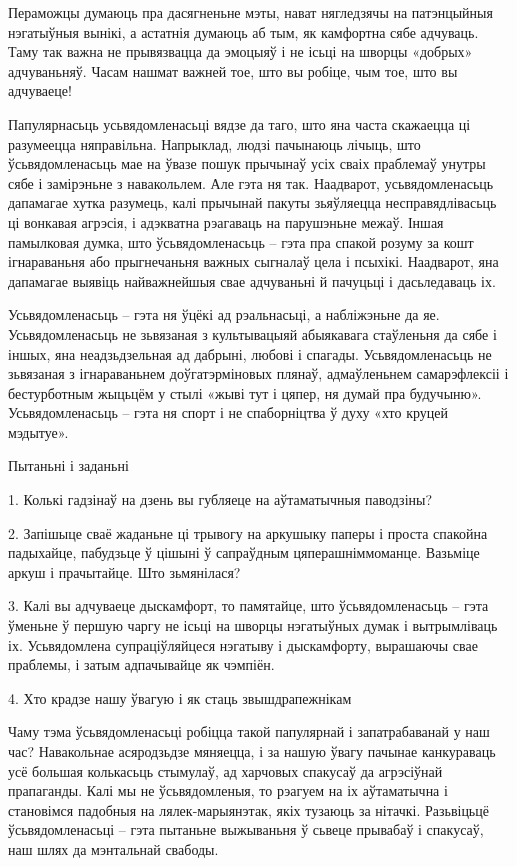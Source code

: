Пераможцы думаюць пра дасягненьне мэты, нават нягледзячы на патэнцыйныя нэгатыўныя вынікі, а астатнія думаюць аб тым, як камфортна сябе адчуваць. Таму так важна не прывязвацца да эмоцыяў і не ісьці на шворцы «добрых» адчуваньняў. Часам нашмат важней тое, што вы робіце, чым тое, што вы адчуваеце!

Папулярнасьць усьвядомленасьці вядзе да таго, што яна часта скажаецца ці разумеецца няправільна. Напрыклад, людзі пачынаюць лічыць, што ўсьвядомленасьць мае на ўвазе пошук прычынаў усіх сваіх праблемаў унутры сябе і замірэньне з навакольлем. Але гэта ня так. Наадварот, усьвядомленасьць дапамагае хутка разумець, калі прычынай пакуты зьяўляецца несправядлівасьць ці вонкавая агрэсія, і адэкватна рэагаваць на парушэньне межаў. Іншая памылковая думка, што ўсьвядомленасьць – гэта пра спакой розуму за кошт ігнараваньня або прыгнечаньня важных сыгналаў цела і псыхікі. Наадварот, яна дапамагае выявіць найважнейшыя свае адчуваньні й пачуцьці і дасьледаваць іх.

Усьвядомленасьць – гэта ня ўцёкі ад рэальнасьці, а набліжэньне да яе. Усьвядомленасьць не зьвязаная з культывацыяй абыякавага стаўленьня да сябе і іншых, яна неадзьдзельная ад дабрыні, любові і спагады. Усьвядомленасьць не зьвязаная з ігнараваньнем доўгатэрміновых плянаў, адмаўленьнем самарэфлексіі і бестурботным жыцьцём у стылі «жыві тут і цяпер, ня думай пра будучыню». Усьвядомленасьць – гэта ня спорт і не спаборніцтва ў духу «хто круцей мэдытуе».

Пытаньні і заданьні

1. Колькі гадзінаў на дзень вы губляеце на аўтаматычныя паводзіны?

2. Запішыце сваё жаданьне ці трывогу на аркушыку паперы і проста спакойна падыхайце, пабудзьце ў цішыні ў сапраўдным цяперашніммоманце. Вазьміце аркуш і прачытайце. Што зьмянілася?

3. Калі вы адчуваеце дыскамфорт, то памятайце, што ўсьвядомленасьць – гэта ўменьне ў першую чаргу не ісьці на шворцы нэгатыўных думак і вытрымліваць іх. Усьвядомлена супраціўляйцеся нэгатыву і дыскамфорту, вырашаючы свае праблемы, і затым адпачывайце як чэмпіён.


4. Хто крадзе нашу ўвагую і як стаць звышдрапежнікам

Чаму тэма ўсьвядомленасьці робіцца такой папулярнай і запатрабаванай у наш час? Навакольнае асяродзьдзе мяняецца, і за нашую ўвагу пачынае канкураваць усё большая колькасьць стымулаў, ад харчовых спакусаў да агрэсіўнай прапаганды. Калі мы не ўсьвядомленыя, то рэагуем на іх аўтаматычна і становімся падобныя на лялек-марыянэтак, якіх тузаюць за нітачкі. Разьвіцьцё ўсьвядомленасьці – гэта пытаньне выжываньня ў сьвеце прывабаў і спакусаў, наш шлях да мэнтальнай свабоды.

